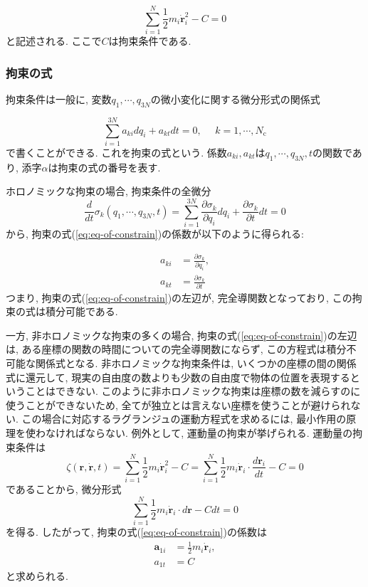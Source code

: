 \begin{equation}
  \sum_{i = 1}^{N} \frac{1}{2} m_{i} \dot{\bm{r}}_{i}^{2} - C = 0
\end{equation}
と記述される. ここで$C$は拘束条件である. 

\subsubsection{拘束の式}
拘束条件は一般に, 変数$q_{1}, \cdots, q_{3N}$の微小変化に関する微分形式の関係式

\begin{equation}
  \sum_{i = 1}^{3N} a_{ki} dq_{i} + a_{kt} dt = 0,~~~~~~ k = 1,\cdots, N_{\mathrm{c}}
  \label{eq:eq-of-constrain}
\end{equation}
で書くことができる. これを拘束の式という. 係数$a_{ki}, a_{kt}$は$q_{1}, \cdots, q_{3N}, t$の関数であり, 添字$\alpha$は拘束の式の番号を表す. 

ホロノミックな拘束の場合, 拘束条件の全微分
\begin{equation}
  \frac{d}{d t} \sigma_{k} (q_1, \cdots, q_{3N}, t)
  =
  \sum_{i = 1}^{3N} \frac{\partial \sigma_{k}}{\partial q_{i}} d q_{i}
  + \frac{\partial \sigma_{k}}{\partial t} dt
  = 0
\end{equation}
から, 拘束の式(\ref{eq:eq-of-constrain})の係数が以下のように得られる:

\begin{align}
  a_{ki} &= \frac{\partial \sigma_{k}}{\partial q_{i}}, \\
  a_{kt} &= \frac{\partial \sigma_{k}}{\partial t}
\end{align}
つまり, 拘束の式(\ref{eq:eq-of-constrain})の左辺が, 完全導関数となっており, この拘束の式は積分可能である. 

一方, 非ホロノミックな拘束の多くの場合, 拘束の式(\ref{eq:eq-of-constrain})の左辺は, ある座標の関数の時間についての完全導関数にならず, この方程式は積分不可能な関係式となる. 非ホロノミックな拘束条件は, いくつかの座標の間の関係式に還元して, 現実の自由度の数よりも少数の自由度で物体の位置を表現するということはできない. このように非ホロノミックな拘束は座標の数を減らすのに使うことができないため, 全てが独立とは言えない座標を使うことが避けられない. この場合に対応するラグランジュの運動方程式を求めるには, 最小作用の原理を使わなければならない. 例外として, 運動量の拘束が挙げられる. 運動量の拘束条件は
\begin{equation}
  \zeta(\bm{r}, \dot{\bm{r}}, t)
  = \sum_{i = 1}^{N} \frac{1}{2} m_{i} \dot{\bm{r}}_{i}^{2} - C
  = \sum_{i = 1}^{N} \frac{1}{2} m_{i} \dot{\bm{r}}_{i} \cdot \frac{d \bm{r}_{i}}{dt} - C
  = 0
\end{equation}
であることから, 微分形式
\begin{equation}
  \sum_{i = 1}^{N} \frac{1}{2} m_{i} \dot{\bm{r}}_{i} \cdot d \bm{r} - C dt = 0
\end{equation}
を得る. したがって, 拘束の式(\ref{eq:eq-of-constrain})の係数は
\begin{align}
  \bm{a}_{1i} &= \frac{1}{2} m_{i} \dot{\bm{r}}_{i}, \\
  a_{1t} &= C
\end{align}
と求められる. 


